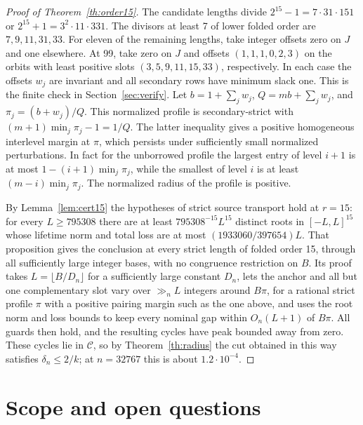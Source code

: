 \documentclass[11pt]{amsart}
\theoremstyle{definition}
\newcommand{\C}{\mathcal C}
\begin{document}
\begin{proof}[Proof of Theorem~\ref{th:order15}]
The candidate lengths divide \(2^{15}-1=7\cdot31\cdot151\)
or \(2^{15}+1=3^2\cdot11\cdot331\).
The divisors at least 7 of lower folded order are
\(7,9,11,31,33\). For eleven of the remaining lengths,
take integer offsets zero on \(J\) and one elsewhere.
At 99, take zero on \(J\) and offsets
\((1,1,1,0,2,3)\) on the orbits with least positive
slots \((3,5,9,11,15,33)\), respectively.
In each case the offsets \(w_j\) are invariant and
all secondary rows have minimum slack one. This is
the finite check in Section~\ref{sec:verify}.
Let \(b=1+\sum_jw_j\), \(Q=mb+\sum_jw_j\), and
\(\pi_j=(b+w_j)/Q\). This normalized profile is
secondary-strict with \((m+1)\min_j\pi_j-1=1/Q\).
The latter inequality gives a positive homogeneous interlevel margin at
\(\pi\), which persists under sufficiently small normalized
perturbations. In fact for
the unborrowed profile the largest entry of level
\(i+1\) is at most \(1-(i+1)\min_j\pi_j\), while
the smallest of level \(i\) is at least
\((m-i)\min_j\pi_j\). The normalized radius of the
profile is positive.

By Lemma~\ref{lem:cert15} the hypotheses of strict source transport
\cite[Proposition~7]{G10} hold at \(r=15\): for every \(L\ge795308\)
there are at least \(795308^{-15}L^{15}\) distinct roots in
\([-L,L]^{15}\) whose lifetime norm and total loss are at most
\((1933060/397654)L\). That proposition gives the conclusion at every
strict length of folded order 15, through all sufficiently large integer
bases, with no congruence restriction on \(B\). Its proof takes
\(L=\lfloor B/D_n\rfloor\) for a sufficiently large constant \(D_n\),
lets the anchor and all but one complementary slot vary over
\(\gg_nL\) integers around \(B\pi\), for a rational strict profile
\(\pi\) with a positive pairing margin such as the one above, and uses
the root norm and loss bounds to keep every nominal gap within
\(O_n(L+1)\) of \(B\pi\). All guards then hold, and the resulting
cycles have peak bounded away from zero. These cycles lie in \(\C\), so
by Theorem~\ref{th:radius} the cut obtained in this way satisfies
\(\delta_n\le2/k\); at \(n=32767\) this is about \(1.2\cdot10^{-4}\).
\end{proof}

\section{Scope and open questions}\label{sec:open}
\end{document}
